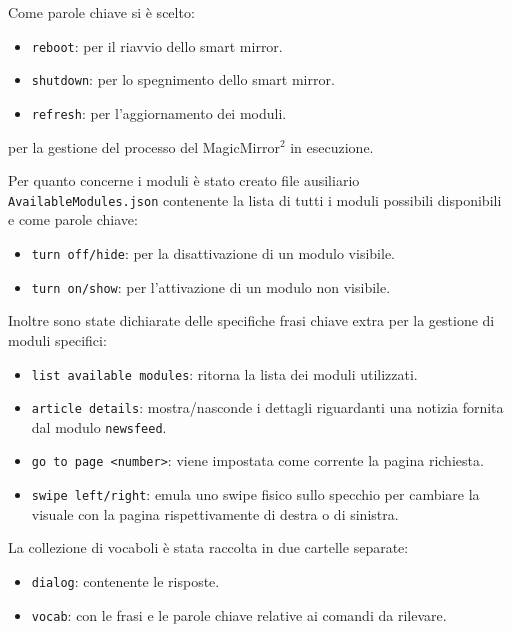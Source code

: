\documentclass[12pt,a4paper]{article}
\begin{document}
Come parole chiave si \`e scelto:
\begin{itemize}
  \item \verb|reboot|: per il riavvio dello smart mirror.
  \item \verb|shutdown|: per lo spegnimento dello smart mirror.
  \item \verb|refresh|: per l'aggiornamento dei moduli.
\end{itemize}
per la gestione del processo del MagicMirror$^2$ in esecuzione.

Per quanto concerne i moduli \`e stato creato file ausiliario \verb|AvailableModules.json| contenente la lista
di tutti i moduli possibili disponibili e come parole chiave:
\begin{itemize}
  \item \verb|turn off/hide|: per la disattivazione di un modulo visibile.
  \item \verb|turn on/show|: per l'attivazione di un modulo non visibile.
\end{itemize}
\newpage
Inoltre sono state dichiarate delle specifiche frasi chiave extra per la gestione di moduli specifici:
\begin{itemize}
  \item \verb|list available modules|: ritorna la lista dei moduli utilizzati.
  \item \verb|article details|: mostra/nasconde i dettagli riguardanti una notizia fornita dal modulo \verb|newsfeed|.
  \item \verb|go to page <number>|: viene impostata come corrente la pagina richiesta.
  \item \verb|swipe left/right|: emula uno swipe fisico sullo specchio per cambiare la visuale con la pagina rispettivamente
      di destra o di sinistra.
\end{itemize}

La collezione di vocaboli \`e stata raccolta in due cartelle separate:
\begin{itemize}
  \item \verb|dialog|: contenente le risposte.
  \item \verb|vocab|: con le frasi e le parole chiave relative ai comandi da rilevare.
\end{itemize}
\end{document}
